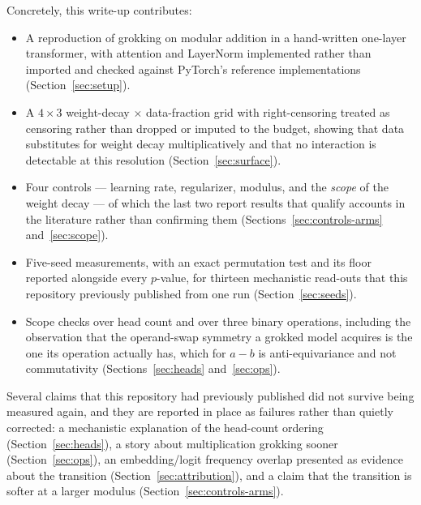 \documentclass[11pt]{article}
\begin{document}
Concretely, this write-up contributes:

\begin{itemize}
  \item A reproduction of grokking on modular addition in a hand-written
    one-layer transformer, with attention and LayerNorm implemented rather
    than imported and checked against PyTorch's reference implementations
    (Section~\ref{sec:setup}).
  \item A $4 \times 3$ weight-decay $\times$ data-fraction grid with
    right-censoring treated as censoring rather than dropped or imputed to the
    budget, showing that data substitutes for weight decay multiplicatively
    and that no interaction is detectable at this resolution
    (Section~\ref{sec:surface}).
  \item Four controls --- learning rate, regularizer, modulus, and the
    \emph{scope} of the weight decay --- of which the last two report results
    that qualify accounts in the literature rather than confirming them
    (Sections~\ref{sec:controls-arms} and~\ref{sec:scope}).
  \item Five-seed measurements, with an exact permutation test and its floor
    reported alongside every $p$-value, for thirteen mechanistic read-outs
    that this repository previously published from one run
    (Section~\ref{sec:seeds}).
  \item Scope checks over head count and over three binary operations,
    including the observation that the operand-swap symmetry a grokked model
    acquires is the one its operation actually has, which for $a - b$ is
    anti-equivariance and not commutativity (Sections~\ref{sec:heads}
    and~\ref{sec:ops}).
\end{itemize}

Several claims that this repository had previously published did not survive
being measured again, and they are reported in place as failures rather than
quietly corrected: a mechanistic explanation of the head-count ordering
(Section~\ref{sec:heads}), a story about multiplication grokking sooner
(Section~\ref{sec:ops}), an embedding/logit frequency overlap presented as
evidence about the transition (Section~\ref{sec:attribution}), and a claim that
the transition is softer at a larger modulus (Section~\ref{sec:controls-arms}).
\end{document}
